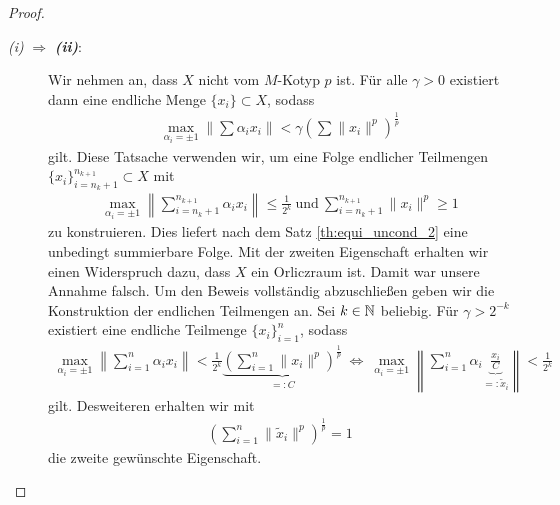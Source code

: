 \begin{proof}
	\begin{description}
		\item[\textit{ \itshape\textrm{(i)}} $ \Rightarrow $ \textbf{\textit{\textrm{(ii)}}}:]
		Wir nehmen an, dass $ X $ nicht vom $ M $-Kotyp $ p $ ist.
		Für alle $ \gamma > 0 $ existiert dann eine endliche Menge $ \{x_i\} \subset X $, sodass
		\begin{align*}
			\max \limits_{\alpha_i = \pm 1}
			\left\|
			\sum \alpha_i x_i
			\right\|
			<
			\gamma
			\left(\sum \| x_i\|^p\right)^\frac{1}{p}
		\end{align*}
		gilt. Diese Tatsache verwenden wir, um eine Folge endlicher Teilmengen\\
		$ \{ x_i\}_{i = n_k + 1}^{n_{k+1}} \subset X $ mit
		\begin{align*}
			\max \limits_{\alpha_i = \pm 1}
			\left\|
			\sum \limits_{i = n_k + 1}^{n_{k+1}} \alpha_i x_i
			\right\| 
			\leq \frac{1}{2^k} \
			\textrm{und} \
			\sum \limits_{i = n_k +1}^{n_{k+1}} \| x_i \|^p \geq 1 
		\end{align*}
		zu konstruieren. 
		Dies liefert nach dem Satz \ref{th:equi_uncond_2} eine unbedingt summierbare Folge. 
		Mit der zweiten Eigenschaft erhalten wir einen Widerspruch dazu, dass $ X $ ein Orliczraum ist.
		Damit war unsere Annahme falsch.
		Um den Beweis vollständig abzuschließen geben wir die Konstruktion der endlichen Teilmengen an.
		Sei $ k \in \mathbb{N} $ beliebig.
		Für $ \gamma > 2^{-k} $ existiert eine endliche Teilmenge $ \{x_i\}_{i=1}^n $, sodass
		\begin{align*}
			\max \limits_{\alpha_i = \pm 1}
			\left\|
			\sum \limits_{i = 1}^n \alpha_i x_i
			\right\|
			<
			\frac{1}{2^k}
			\underbrace{\left(\sum \limits_{i = 1}^n \| x_i\|^p\right)^\frac{1}{p}}_{=: C}
			\ \Leftrightarrow \
			\max \limits_{\alpha_i = \pm 1}
			\left\|
			\sum \limits_{i = 1}^n \alpha_i \underbrace{\frac{x_i}{C}}_{=: \tilde{x}_i}
			\right\|
			<
			\frac{1}{2^k}
		\end{align*}
		gilt. 
		Desweiteren erhalten wir mit
		\begin{align*}
		\left(\sum \limits_{i = 1}^n \| \tilde{x}_i \|^p\right)^\frac{1}{p} = 1
		\end{align*}
		die zweite gewünschte Eigenschaft.
		

\end{description}
\end{proof}
